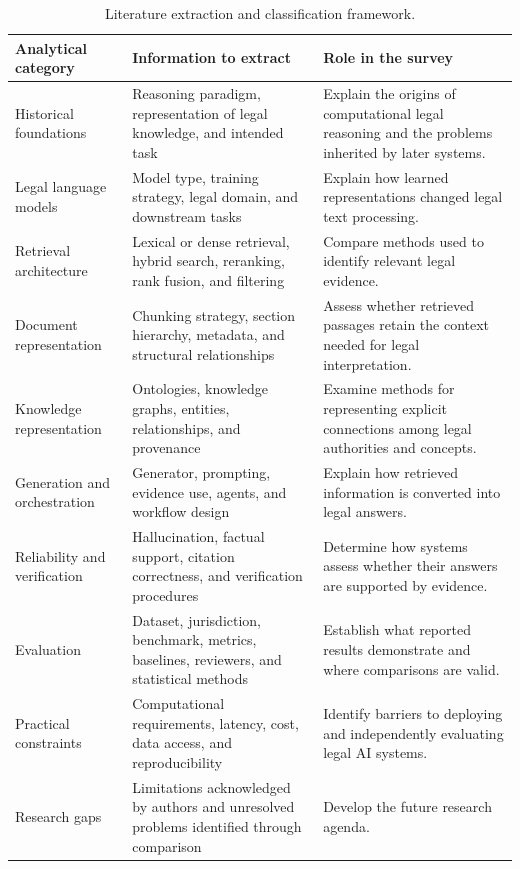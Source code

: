 \begin{table}[tp]
\centering
\caption{Literature extraction and classification framework.}
\label{tab:extract}
\footnotesize
\setlength{\tabcolsep}{5pt}
\renewcommand{\arraystretch}{1.3}
\begin{tabularx}{\textwidth}{>{\raggedright\arraybackslash}p{3.0cm} >{\raggedright\arraybackslash}X >{\raggedright\arraybackslash}X}
\toprule
\textbf{Analytical category} & \textbf{Information to extract} & \textbf{Role in the survey} \\
\midrule
Historical foundations & Reasoning paradigm, representation of legal knowledge, and intended task & Explain the origins of computational legal reasoning and the problems inherited by later systems. \\
Legal language models & Model type, training strategy, legal domain, and downstream tasks & Explain how learned representations changed legal text processing. \\
Retrieval architecture & Lexical or dense retrieval, hybrid search, reranking, rank fusion, and filtering & Compare methods used to identify relevant legal evidence. \\
Document representation & Chunking strategy, section hierarchy, metadata, and structural relationships & Assess whether retrieved passages retain the context needed for legal interpretation. \\
Knowledge representation & Ontologies, knowledge graphs, entities, relationships, and provenance & Examine methods for representing explicit connections among legal authorities and concepts. \\
Generation and orchestration & Generator, prompting, evidence use, agents, and workflow design & Explain how retrieved information is converted into legal answers. \\
Reliability and verification & Hallucination, factual support, citation correctness, and verification procedures & Determine how systems assess whether their answers are supported by evidence. \\
Evaluation & Dataset, jurisdiction, benchmark, metrics, baselines, reviewers, and statistical methods & Establish what reported results demonstrate and where comparisons are valid. \\
Practical constraints & Computational requirements, latency, cost, data access, and reproducibility & Identify barriers to deploying and independently evaluating legal AI systems. \\
Research gaps & Limitations acknowledged by authors and unresolved problems identified through comparison & Develop the future research agenda. \\
\bottomrule
\end{tabularx}
\end{table}

